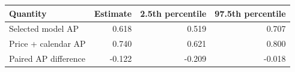 \begin{tabular}{lrrr}
\toprule
Quantity & Estimate & 2.5th percentile & 97.5th percentile \\
\midrule
Selected model AP & 0.618 & 0.519 & 0.707 \\
Price + calendar AP & 0.740 & 0.621 & 0.800 \\
Paired AP difference & -0.122 & -0.209 & -0.018 \\
\bottomrule
\end{tabular}
